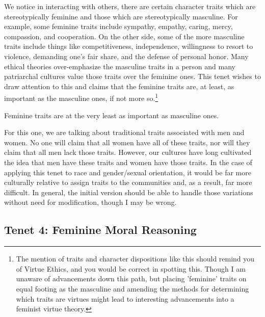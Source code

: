 We notice in interacting with others, there are certain character traits which are stereotypically feminine and those which are stereotypically masculine. For example, some feminine traits include sympathy, empathy, caring, mercy, compassion, and cooperation. On the other side, some of the more masculine traits include things like competitiveness, independence, willingness to resort to violence, demanding one’s fair share, and the defense of personal honor. Many ethical theories over-emphasize the masculine traits in a person and many patriarchal cultures value those traits over the feminine ones. This tenet wishes to draw attention to this and claims that the feminine traits are, at least, as important as the masculine ones, if not more so.\footnote{The mention of traits and character dispositions like this should remind you of Virtue Ethics, and you would be correct in spotting this. Though I am unaware of advancements down this path, but placing 'feminine' traits on equal footing as the masculine and amending the methods for determining which traits are virtues might lead to interesting advancements into a feminist virtue theory.}
\begin{center}
Feminine traits are at the very least as important as masculine ones.
\end{center}
For this one, we are talking about traditional traits associated with men and women. No one will claim that all women have all of these traits, nor will they claim that all men lack those traits. However, our cultures have long cultivated the idea that men have these traits and women have those traits. In the case of applying this tenet to race and gender/sexual orientation, it would be far more culturally relative to assign traits to the communities and, as a result, far more difficult. In general, the initial version should be able to handle those variations without need for modification, though I may be wrong.

\subsection{Tenet 4: Feminine Moral Reasoning}

